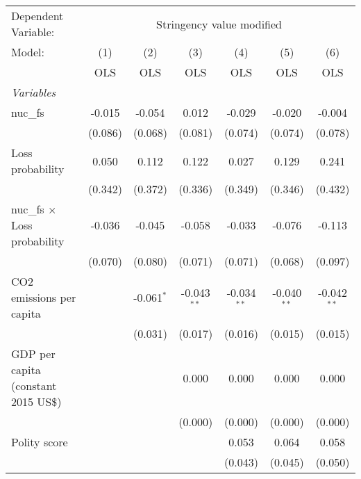 
\begingroup
\centering
\begin{tabular}{lcccccc}
   \toprule
   Dependent Variable: & \multicolumn{6}{c}{Stringency value modified}\\
   Model:                               & (1)     & (2)          & (3)           & (4)           & (5)           & (6)\\  
                                        &  OLS    & OLS          & OLS           & OLS           & OLS           & OLS\\  
   \midrule
   \emph{Variables}\\
   nuc\_fs                              & -0.015  & -0.054       & 0.012         & -0.029        & -0.020        & -0.004\\   
                                        & (0.086) & (0.068)      & (0.081)       & (0.074)       & (0.074)       & (0.078)\\   
   Loss probability                     & 0.050   & 0.112        & 0.122         & 0.027         & 0.129         & 0.241\\   
                                        & (0.342) & (0.372)      & (0.336)       & (0.349)       & (0.346)       & (0.432)\\   
   nuc\_fs $\times$ Loss probability    & -0.036  & -0.045       & -0.058        & -0.033        & -0.076        & -0.113\\   
                                        & (0.070) & (0.080)      & (0.071)       & (0.071)       & (0.068)       & (0.097)\\   
   CO2 emissions per capita             &         & -0.061$^{*}$ & -0.043$^{**}$ & -0.034$^{**}$ & -0.040$^{**}$ & -0.042$^{**}$\\   
                                        &         & (0.031)      & (0.017)       & (0.016)       & (0.015)       & (0.015)\\   
   GDP per capita (constant 2015 US\$)  &         &              & 0.000         & 0.000         & 0.000         & 0.000\\   
                                        &         &              & (0.000)       & (0.000)       & (0.000)       & (0.000)\\   
   Polity score                         &         &              &               & 0.053         & 0.064         & 0.058\\   
                                        &         &              &               & (0.043)       & (0.045)       & (0.050)\\   

\end{tabular}
